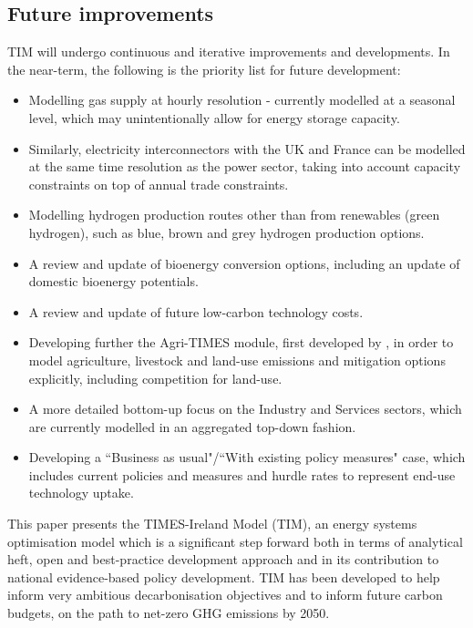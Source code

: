 \documentclass[gmd,manuscript]{copernicus}
\begin{document}
\subsection{Future improvements}
TIM will undergo continuous and iterative improvements and developments. In the near-term, the following is the priority list for future development:
\begin{itemize}
 \item Modelling gas supply at hourly resolution - currently modelled at a seasonal level, which may unintentionally allow for energy storage capacity.
 \item Similarly, electricity interconnectors with the UK and France can be modelled at the same time resolution as the power sector, taking into account capacity constraints on top of annual trade constraints.
 \item Modelling hydrogen production routes other than from renewables (green hydrogen), such as blue, brown and grey hydrogen production options. 
 \item A review and update of bioenergy conversion options, including an update of domestic bioenergy potentials. 
 \item A review and update of future low-carbon technology costs.
 \item Developing further the Agri-TIMES module, first developed by \citet{Chiodi2016}, in order to model agriculture, livestock and land-use emissions and mitigation options explicitly, including competition for land-use.
 \item A more detailed bottom-up focus on the Industry and Services sectors, which are currently modelled in an aggregated top-down fashion. 
 \item Developing a ``Business as usual"/``With existing policy measures" case, which includes current policies and measures and hurdle rates to represent end-use technology uptake.
\end{itemize}


\conclusions  %
\label{s:conclusion}
This paper presents the TIMES-Ireland Model (TIM), an energy systems optimisation model which is a significant step forward both in terms of analytical heft, open and best-practice development approach and in its contribution to national evidence-based policy development. TIM has been developed to help inform very ambitious decarbonisation objectives and to inform future carbon budgets, on the path to net-zero GHG emissions by 2050. 
\end{document}
